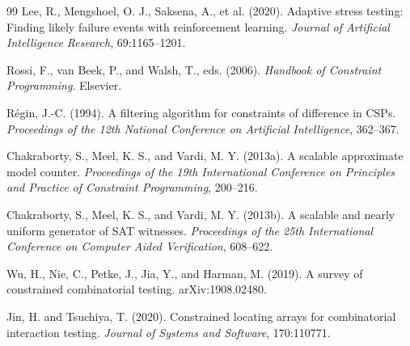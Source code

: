 \documentclass[UTF8,11pt,a4paper,fontset=none]{ctexart}
\newcommand{\1}{\mathbf 1}
\begin{document}
\begin{thebibliography}{99}
Lee, R., Mengshoel, O. J., Saksena, A., et al. (2020).
Adaptive stress testing: Finding likely failure events with reinforcement learning.
\emph{Journal of Artificial Intelligence Research}, 69:1165--1201.

Rossi, F., van Beek, P., and Walsh, T., eds. (2006).
\emph{Handbook of Constraint Programming}.
Elsevier.

R\'{e}gin, J.-C. (1994).
A filtering algorithm for constraints of difference in CSPs.
\emph{Proceedings of the 12th National Conference on Artificial Intelligence}, 362--367.

Chakraborty, S., Meel, K. S., and Vardi, M. Y. (2013a).
A scalable approximate model counter.
\emph{Proceedings of the 19th International Conference on Principles and Practice of Constraint Programming}, 200--216.

Chakraborty, S., Meel, K. S., and Vardi, M. Y. (2013b).
A scalable and nearly uniform generator of SAT witnesses.
\emph{Proceedings of the 25th International Conference on Computer Aided Verification}, 608--622.

Wu, H., Nie, C., Petke, J., Jia, Y., and Harman, M. (2019).
A survey of constrained combinatorial testing.
arXiv:1908.02480.

Jin, H. and Tsuchiya, T. (2020).
Constrained locating arrays for combinatorial interaction testing.
\emph{Journal of Systems and Software}, 170:110771.

\end{thebibliography}
\end{document}
